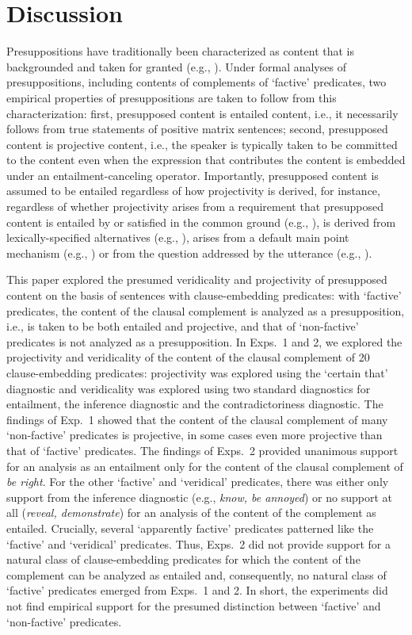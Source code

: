 \documentclass[11pt,fleqn]{article}
\newcommand{\6}{\mbox{$[\hspace*{-.6mm}[$}}
\newcommand{\9}{\mbox{$]\hspace*{-.6mm}]$}}
\begin{document}
{\section{Discussion}\label{s4}

Presuppositions have traditionally been characterized as content that is backgrounded and taken for granted (e.g., \citealt{stalnaker74,ccmg90}). Under formal analyses of presuppositions, including contents of complements of `factive' predicates, two empirical properties of presuppositions are taken to follow from this characterization: first, presupposed content is entailed content, i.e., it necessarily follows from true statements of positive matrix sentences; second, presupposed content is projective content, i.e., the speaker is typically taken to be committed to the content even when the expression that contributes the content is embedded under an entailment-canceling operator. Importantly, presupposed content is assumed to be entailed regardless of how projectivity is derived, for instance, regardless of whether projectivity arises from a requirement that presupposed content is entailed by or satisfied in the common ground (e.g., \citealt{heim83,vds92}),  is derived  from lexically-specified alternatives (e.g., \citealt{abusch10,romoli2015}), arises from a default main point mechanism (e.g., \citealt{abrusan2011,abrusan2016}) or from the question addressed by the utterance (e.g., \citealt{best-question}). 

This paper explored the presumed veridicality and projectivity of presupposed content on the basis of sentences with clause-embedding predicates: with `factive' predicates, the content of the clausal complement is analyzed as a presupposition, i.e., is taken to be both entailed and projective, and that of `non-factive' predicates is not analyzed as a presupposition. In Exps.~1 and 2, we explored the projectivity and veridicality of the content of the clausal complement of 20 clause-embedding predicates: projectivity was explored using the `certain that' diagnostic and veridicality was explored using two standard diagnostics for entailment, the inference diagnostic and the contradictoriness diagnostic. The findings of Exp.~1 showed that the content of the clausal complement of many `non-factive' predicates is projective, in some cases even more projective than that of `factive' predicates. The findings of Exps.~2  provided unanimous support for an analysis as an entailment only for the content of the clausal complement of {\em be right}. For the other `factive' and `veridical' predicates, there was either only support from the inference diagnostic (e.g., {\em know, be annoyed}) or no support at all ({\em reveal, demonstrate}) for an analysis of the content of the complement as entailed. Crucially, several `apparently factive' predicates patterned like the `factive' and `veridical' predicates. Thus, Exps.~2 did not provide support for a natural class of clause-embedding predicates for which the content of the complement can be analyzed as entailed and, consequently, no natural class of `factive' predicates emerged from Exps.~1 and 2. In short, the experiments did not find empirical support for the presumed distinction between `factive' and `non-factive' predicates.

}
\end{document}
